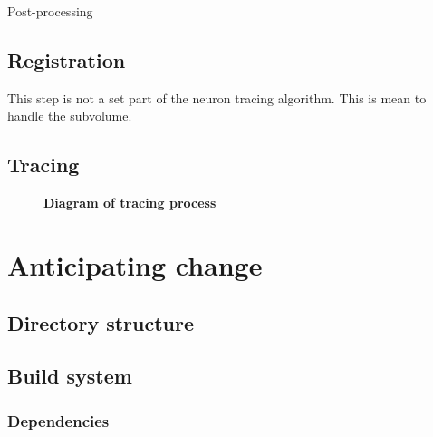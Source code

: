 \begin{algorithm}
	\caption{Post-processing}\label{alg:seg_post}
	\begin{algorithmic}[1]
	\end{algorithmic}
\end{algorithm}

\subsection{Registration}

This step is not a set part of the neuron tracing algorithm. This is mean to handle the subvolume.

\subsection{Tracing}

\begin{figure}
\centering
\resizebox{1.0\textwidth}{!}{}
\caption[Diagram of tracing process]{\textbf{Diagram of tracing process}}\label{fig:proc-tracing}
\end{figure}



\section{Anticipating change}


\subsection{Directory structure}

\begin{description}[font=\tt]
\item[lib]
\item[lib/t]
\item[src]
\end{description}


\subsection{Build system}


\subsubsection{Dependencies}

